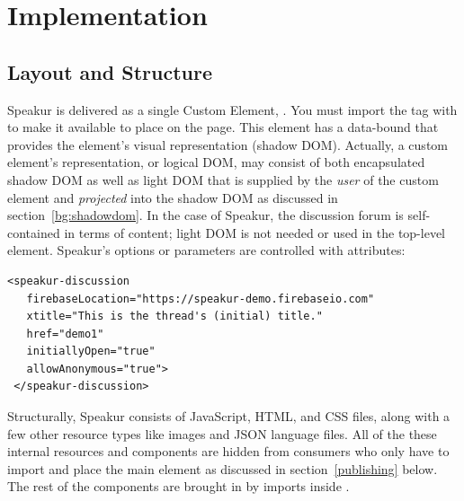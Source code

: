 \chapter{Implementation}
%

\section{Layout and Structure}
\label{sec:layout}

Speakur is delivered as a single Custom Element, .
You must import the tag with  to make it available to place on the page. 
This element has a data-bound  that provides the element's visual representation (shadow DOM).
Actually, a custom element's representation, or logical DOM, may consist of both encapsulated shadow DOM as well as light DOM that is supplied by the \textit{user} of the custom element and \textit{projected} into the shadow DOM as discussed in section~\ref{bg:shadowdom}.
In the case of Speakur, the discussion forum is self-contained in terms of content; light DOM is not needed or used in the top-level element.
Speakur's options or parameters are controlled with attributes:

\begin{lstlisting}[language=HTML5,caption=
{Using HTML attributes to set Speakur options},label=l:options1,captionpos=below]
 <speakur-discussion
   firebaseLocation="https://speakur-demo.firebaseio.com"
   xtitle="This is the thread's (initial) title."
   href="demo1"
   initiallyOpen="true"
   allowAnonymous="true">
 </speakur-discussion>
\end{lstlisting}

Structurally, Speakur consists of JavaScript, HTML, and CSS files, along with a few other resource types like images and JSON language files. 
All of the these internal resources and components are hidden from consumers who only have to import and place the main  element as discussed in section~\ref{publishing} below.
The rest of the components are brought in by imports inside .

